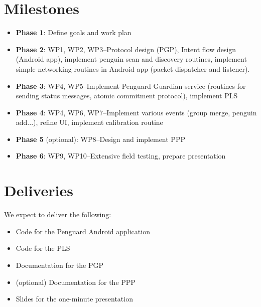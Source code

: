 \documentclass{report}
\begin{document}
\section{Milestones}

\begin{itemize}
    \item \textbf{Phase 1}: Define goals and work plan
    \item \textbf{Phase 2}: WP1, WP2, WP3--Protocol design (PGP), Intent flow design (Android app), implement penguin scan and discovery routines, implement simple networking routines in Android app (packet dispatcher and listener).
    \item \textbf{Phase 3}: WP4, WP5--Implement Penguard Guardian service (routines for sending status messages, atomic commitment protocol), implement PLS
    \item \textbf{Phase 4}: WP4, WP6, WP7--Implement various events (group merge, penguin add...), refine UI, implement calibration routine
    \item \textbf{Phase 5} (optional): WP8--Design and implement PPP
    \item \textbf{Phase 6}: WP9, WP10--Extensive field testing, prepare presentation
\end{itemize}




\section{Deliveries}

We expect to deliver the following:

\begin{itemize}
    \item Code for the Penguard Android application
    \item Code for the PLS
    \item Documentation for the PGP
    \item (optional) Documentation for the PPP
    \item Slides for the one-minute presentation
\end{itemize}
\end{document}
